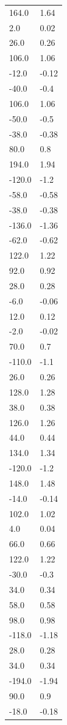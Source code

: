 \begin{longtable}{ll}
164.0 & 1.64 \\
2.0 & 0.02 \\
26.0 & 0.26 \\
106.0 & 1.06 \\
-12.0 & -0.12 \\
-40.0 & -0.4 \\
106.0 & 1.06 \\
-50.0 & -0.5 \\
-38.0 & -0.38 \\
80.0 & 0.8 \\
194.0 & 1.94 \\
-120.0 & -1.2 \\
-58.0 & -0.58 \\
-38.0 & -0.38 \\
-136.0 & -1.36 \\
-62.0 & -0.62 \\
122.0 & 1.22 \\
92.0 & 0.92 \\
28.0 & 0.28 \\
-6.0 & -0.06 \\
12.0 & 0.12 \\
-2.0 & -0.02 \\
70.0 & 0.7 \\
-110.0 & -1.1 \\
26.0 & 0.26 \\
128.0 & 1.28 \\
38.0 & 0.38 \\
126.0 & 1.26 \\
44.0 & 0.44 \\
134.0 & 1.34 \\
-120.0 & -1.2 \\
148.0 & 1.48 \\
-14.0 & -0.14 \\
102.0 & 1.02 \\
4.0 & 0.04 \\
66.0 & 0.66 \\
122.0 & 1.22 \\
-30.0 & -0.3 \\
34.0 & 0.34 \\
58.0 & 0.58 \\
98.0 & 0.98 \\
-118.0 & -1.18 \\
28.0 & 0.28 \\
34.0 & 0.34 \\
-194.0 & -1.94 \\
90.0 & 0.9 \\
-18.0 & -0.18 \\

\end{longtable}
